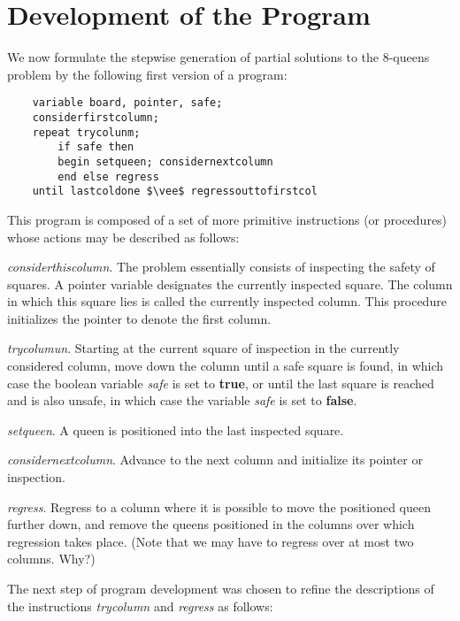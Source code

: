 \section{Development of the Program}

We now formulate the stepwise generation of partial solutions to the 8-queens
problem by the following first version of a program:

\begin{lstlisting}
    variable board, pointer, safe;
    considerfirstcolumn;
    repeat trycolunm;
        if safe then
        begin setqueen; considernextcolumn
        end else regress
    until lastcoldone $\vee$ regressouttofirstcol
\end{lstlisting}


This program is composed of a set of more primitive instructions (or
procedures) whose actions may be described as follows:

\vspace{5mm}
\begin{small}
\emph{considerthiscolumn}.  The problem essentially consists of inspecting the
safety of squares.  A pointer variable designates the currently inspected
square.  The column in which this square lies is called the currently inspected
column.  This procedure initializes the pointer to denote the first column.

\emph{trycolumun}.  Starting at the current square of inspection in the
currently considered column, move down the column until a safe square is found,
in which case the boolean variable \emph{safe} is set to \textbf{true}, or
until the last square is reached and is also unsafe, in which case the variable
\emph{safe} is set to \textbf{false}.

\emph{setqueen}.  A queen is positioned into the last inspected square.

\emph{considernextcolumn}.  Advance to the next column and initialize its
pointer or inspection.

\emph{regress}.  Regress to a column where it is possible to move the
positioned queen further down, and remove the queens positioned in the columns
over which regression takes place.  (Note that we may have to regress over at
most two columns. Why?)
\end{small}
\vspace{5mm}

The next step of program development was chosen to refine the descriptions of
the instructions \emph{trycolumn} and \emph{regress} as follows:

